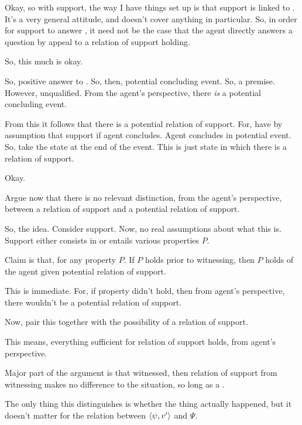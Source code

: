 \begin{note}
  Okay, so with support, the way I have things set up is that support is linked to \qWhy{}.
  It's a very general attitude, and doesn't cover anything in particular.
  So, in order for support to answer \qWhy{}, it need not be the case that the agent directly answers a question by appeal to a relation of support holding.

  So, this much is okay.

  So, positive answer to \qzS{}.
  So, then, potential concluding event.
  So, a premise.
  However, unqualified.
  From the agent's perspective, there \emph{is} a potential concluding event.

  From this it follows that there is a potential relation of support.
  For, have by assumption that support if agent concludes.
  Agent concludes in potential event.
  So, take the state at the end of the event.
  This is just state in which there is a relation of support.

  Okay.

  Argue now that there is no relevant distinction, from the agent's perspective, between a relation of support and a potential relation of support.

  So, the idea.
  Consider support.
  Now, no real assumptions about what this is.
  Support either consists in or entails various properties \(P\).

  Claim is that, for any property \(P\).
  If \(P\) holds prior to witnessing, then \(P\) holds of the agent given potential relation of support.

  This is immediate.
  For, if property didn't hold, then from agent's perspective, there wouldn't be a potential relation of support.

  Now, pair this together with the possibility of a relation of support.

  This means, everything sufficient for relation of support holds, from agent's perspective.
\end{note}



\newpage

\begin{note}
  \color{red}

  Major part of the argument is that witnessed, then relation of support from witnessing makes no difference to the situation, so long as a \requ{}.

  The only thing this distinguishes is whether the thing actually happened, but it doesn't matter for the relation between \(\langle \psi, v' \rangle\) and \(\Psi\).
\end{note}

